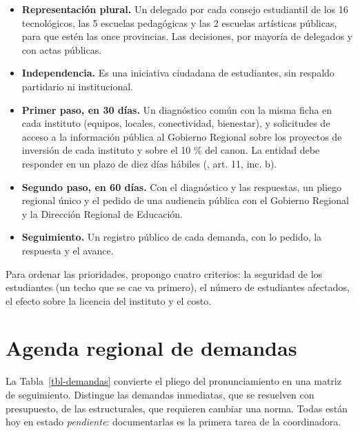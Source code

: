 \documentclass[
  jou,
  floatsintext,
  longtable,
  a4paper,
  nolmodern,
  notxfonts,
  notimes,
  12pt,
  colorlinks=true,linkcolor=blue,citecolor=blue,urlcolor=blue]{apa7}
\providecommand{\tightlist}{%
  \setlength{\itemsep}{0pt}\setlength{\parskip}{0pt}}
\begin{document}
\begin{itemize}
\tightlist
\item
  \textbf{Representación plural.} Un delegado por cada consejo
  estudiantil de los 16 tecnológicos, las 5 escuelas pedagógicas y las 2
  escuelas artísticas públicas, para que estén las once provincias. Las
  decisiones, por mayoría de delegados y con actas públicas.
\item
  \textbf{Independencia.} Es una iniciativa ciudadana de estudiantes,
  sin respaldo partidario ni institucional.
\item
  \textbf{Primer paso, en 30 días.} Un diagnóstico común con la misma
  ficha en cada instituto (equipos, locales, conectividad, bienestar), y
  solicitudes de acceso a la información pública al Gobierno Regional
  sobre los proyectos de inversión de cada instituto y sobre el 10 \%
  del canon. La entidad debe responder en un plazo de diez días hábiles
  (, art. 11, inc. b).
\item
  \textbf{Segundo paso, en 60 días.} Con el diagnóstico y las
  respuestas, un pliego regional único y el pedido de una audiencia
  pública con el Gobierno Regional y la Dirección Regional de Educación.
\item
  \textbf{Seguimiento.} Un registro público de cada demanda, con lo
  pedido, la respuesta y el avance.
\end{itemize}

Para ordenar las prioridades, propongo cuatro criterios: la seguridad de
los estudiantes (un techo que se cae va primero), el número de
estudiantes afectados, el efecto sobre la licencia del instituto y el
costo.

\section{Agenda regional de demandas}\label{agenda-regional-de-demandas}

La Tabla~\ref{tbl-demandas} convierte el pliego del pronunciamiento en
una matriz de seguimiento. Distingue las demandas inmediatas, que se
resuelven con presupuesto, de las estructurales, que requieren cambiar
una norma. Todas están hoy en estado \emph{pendiente}: documentarlas es
la primera tarea de la coordinadora.
\end{document}
